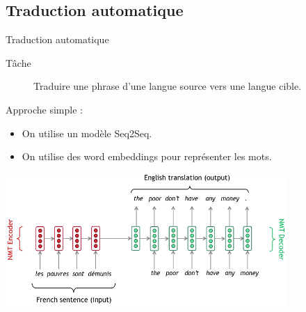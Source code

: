 \documentclass[french]{beamer}
\begin{document}

\subsection{Traduction automatique}

\begin{frame}{Traduction automatique}

\begin{description}
	\item [Tâche] Traduire une phrase d'une langue source vers une langue cible.
\end{description}

Approche simple :
\begin{itemize}
	\item On utilise un modèle Seq2Seq.
	\item On utilise des word embeddings pour représenter les mots.
\end{itemize}
\centering
\includegraphics[width=0.8\textwidth]{figures/seq2seq_machine_translation}
\end{frame}
\end{document}
